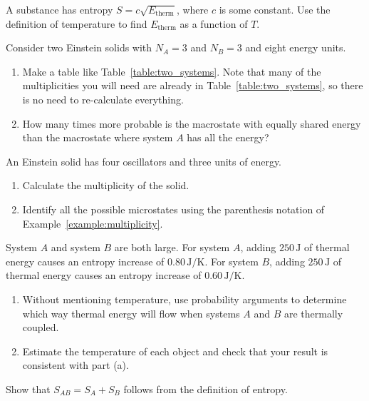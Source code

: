 \begin{exercise}
A substance has entropy $S=c\sqrt{E_\text{therm}}$, where $c$ is
  some constant.  Use the definition of temperature to find
  $E_\text{therm}$ as a function of $T$.
\end{exercise}

\begin{exercise}
Consider two Einstein solids with $N_A=3$ and $N_B=3$ and eight energy
units. 
\begin{enumerate}
\item Make a table like Table~\ref{table:two_systems}.  Note that many
  of the multiplicities you will need are already in
  Table~\ref{table:two_systems}, so there is no need to re-calculate
  everything. 
\item How many times more probable is the macrostate with equally
  shared energy than the macrostate where system $A$ has all the energy?
\end{enumerate}
\end{exercise}

\begin{exercise}
An Einstein solid has four oscillators and three units of energy.
\begin{enumerate}
\item Calculate the multiplicity of the solid.
\item Identify all the possible microstates using the parenthesis
  notation of Example~\ref{example:multiplicity}.
\end{enumerate}
\end{exercise}

\begin{exercise}
System $A$ and system $B$ are both large.    For system $A$, adding
$250\,\text{J}$ of thermal energy causes an entropy increase of
$0.80\,\text{J/K}$.  For system $B$, adding $250\,\text{J}$ of thermal
energy causes an entropy increase of $0.60\,\text{J/K}$.
\begin{enumerate}
\item Without mentioning temperature, use probability arguments to
  determine which way thermal energy will flow when systems $A$ and
  $B$ are thermally coupled.
\item Estimate the temperature of each object and check that your
  result is consistent with part (a).
\end{enumerate}
\end{exercise}

\begin{exercise}
Show that $S_{AB} = S_A + S_B$ follows from the definition of entropy.
\label{problem:entropy_additive}
\end{exercise}


